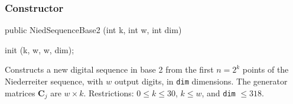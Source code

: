 \subsubsection* {Constructor}
\begin{code} 

   public NiedSequenceBase2 (int k, int w, int dim) \begin{hide} {
      init (k, w, w, dim);
   } 
\end{hide}
\end{code} 
\begin{tabb}
    Constructs a new digital sequence in base 2 from the first $n=2^k$ points 
    of the Niederreiter sequence,
    with $w$ output digits, in \texttt{dim} dimensions.
    The generator matrices $\mathbf{C}_j$ are $w\times k$.
    Restrictions: $0\le k\le 30$, $k\le w$, and \texttt{dim} $\le 318$.
\end{tabb}
\begin{htmlonly}
\end{htmlonly}
